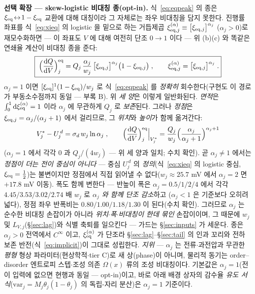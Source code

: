 \textbf{선택 확장 --- skew-logistic 비대칭 종(opt-in).} 식~\eqref{eq:eqpeak} 의 종은
$\xi_{\mathrm{eq}}\!\leftrightarrow\!1-\xi_{\mathrm{eq}}$ 교환에 대해 대칭이라 그 자체로는 좌우 비대칭을 담지 못한다.
진행률 좌표를 식~\eqref{eq:xieq} 의 logistic 을 밑으로 하는 거듭제곱
$\xi^{(\alpha)}_{\mathrm{eq},j}\equiv\big[\xi_{\mathrm{eq},j}\big]^{\alpha_j}$ ($\alpha_j>0$)로 재모수화하면 --- 이 좌표도
$V$ 에 대해 여전히 단조 $0\!\to\!1$ 이다 --- 위 (b)(c) 와 똑같은 연쇄율 계산이 비대칭 종을 준다:
\begin{equation}
\boxed{\;\Big(\frac{\mathrm{d} Q}{\mathrm{d} V}\Big)^{\mathrm{eq}}_j
=Q_j\,\frac{\alpha_j}{w_j}\,\big[\xi_{\mathrm{eq},j}\big]^{\alpha_j}\big(1-\xi_{\mathrm{eq},j}\big)\;,
\qquad \xi^{(\alpha)}_{\mathrm{eq},j}=\big[\xi_{\mathrm{eq},j}\big]^{\alpha_j}\;.}
\label{eq:skewpeak}
\end{equation}
$\alpha_j=1$ 이면 $[\xi_{\mathrm{eq}}]^1(1-\xi_{\mathrm{eq}})/w_j$ 로 식~\eqref{eq:eqpeak} 를 \emph{정확히} 회수한다(구현도
이 경로가 부동소수점까지 동일 --- 부록 B). 위 \emph{세 양}은 이렇게 일반화된다. \emph{면적}은
$\int_0^1\mathrm{d}\xi^{(\alpha)}_{\mathrm{eq}}=1$ 이라 $\alpha_j$ 에 무관하게 $Q_j$ 로 \emph{보존}된다. 그러나
\emph{정점}은 $\xi_{\mathrm{eq},j}=\alpha_j/(\alpha_j+1)$ 에서 걸리므로, 그 \emph{위치}와 \emph{높이}가 함께 옮겨간다:
\begin{equation}
V^\ast_j-U_j^{\,d}=\sigma_d\,w_j\ln\alpha_j\;,\qquad
\Big(\frac{\mathrm{d} Q}{\mathrm{d} V}\Big)^{\mathrm{eq}}_{j}\Big|_{V^\ast_j}
=\frac{Q_j}{w_j}\Big(\frac{\alpha_j}{\alpha_j+1}\Big)^{\alpha_j+1}
\label{eq:skewapex}
\end{equation}
($\alpha_j=1$ 에서 각각 $0$ 과 $Q_j/(4w_j)$ --- 위 세 양과 일치; 수치 확인). 곧 $\alpha_j\ne1$ 에서는
\emph{정점이 더는 전이 중심이 아니다} --- 중심 $U_j^{\,d}$ 의
\emph{정의}(식~\eqref{eq:xieq} 의 logistic 중심, $\xi_{\mathrm{eq}}=\tfrac12$)는 불변이지만 정점에서 직접 읽어낼 수
없다($w_j\!\approx\!25.7$ mV 에서 $\alpha_j=2$ 면 $+17.8$ mV 이동). 폭도 함께 변한다 --- 반높이 폭은
$\alpha_j=0.5/1/2/4$ 에서 각각 $4.45/3.53/3.02/2.74$ 배 $w_j$ 로 \emph{$\alpha_j$ 와 함께 단조 감소}하고
($\alpha_j<1$ 은 기준보다 오히려 넓다), 정점 좌우 반폭비는 $0.80/1.00/1.18/1.30$ 이 된다(수치 확인).
그러므로 $\alpha_j$ 는 순수한 비대칭 손잡이가 아니라
\emph{위치$\cdot$폭$\cdot$비대칭이 한데 묶인} 손잡이이며, 그 때문에 $w_j$ 및
$L_{V,j}$(\S\ref{sec:lag})와 식별 축퇴를 일으킨다 --- 가드는 \S\ref{sec:inputs} 가 세운다.
종은 $\alpha_j>0$ 전역에서 $C^\infty$ 이고, $\xi^{(\alpha)}_{\mathrm{eq}}$ 가 단조라
\S\ref{sec:lag}--\S\ref{sec:tail} 의 인과 꼬리와 전하 보존 반전(식~\eqref{eq:implicit})이 그대로 성립한다.
\emph{지위} --- $\alpha_j$ 는 전류$\cdot$과전압과 무관한 \emph{평형} 형상 파라미터(현상학적$\cdot$tier C)로
새 상(phase)이 아니며, 물리적 동기는 order--disorder 엔트로피 스텝$\cdot$조성 의존 $\Omega(x)$ 류의 조성
비대칭이다. 기본값은 $\alpha_j=1$(전이 입력에 없으면 현행과 동일 --- opt-in)이고, 바로 아래 배경 상자의
감수율 \emph{유도 서식}($\mathrm{var}_j=M_j\theta_j(1-\theta_j)$ 의 독립-자리 분산)은 $\alpha_j=1$ 기준이다.

